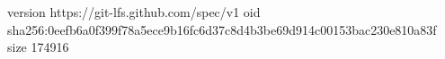 version https://git-lfs.github.com/spec/v1
oid sha256:0eefb6a0f399f78a5ece9b16fc6d37c8d4b3be69d914c00153bac230e810a83f
size 174916
